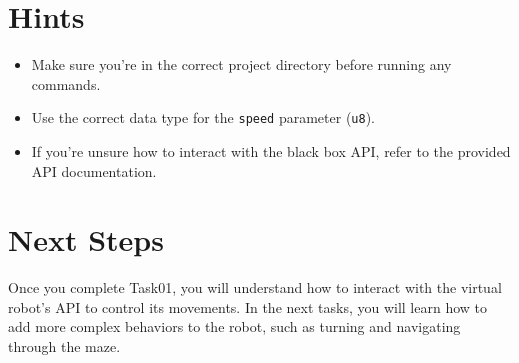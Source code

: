 \documentclass[12pt]{article}
\begin{document}
	\section*{Hints}
	\begin{itemize}
		\item Make sure you’re in the correct project directory before running any commands.
		\item Use the correct data type for the \texttt{speed} parameter (\texttt{u8}).
		\item If you’re unsure how to interact with the black box API, refer to the provided API documentation.
	\end{itemize}
	
	\section*{Next Steps}
	Once you complete Task01, you will understand how to interact with the virtual robot’s API to control its movements. In the next tasks, you will learn how to add more complex behaviors to the robot, such as turning and navigating through the maze.
	
\end{document}

